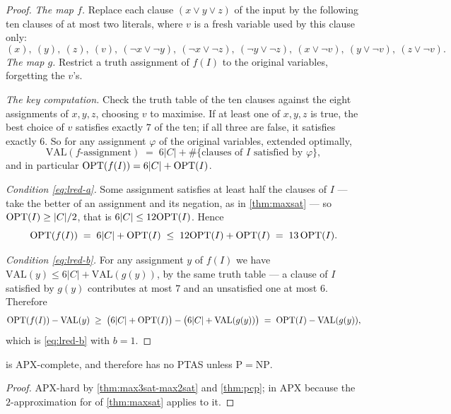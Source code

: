 \begin{proof}
\emph{The map $f$.} Replace each clause $(x \vee y \vee z)$ of the input by the
following ten clauses of at most two literals, where $v$ is a fresh variable
used by this clause only:
\[ (x),\ (y),\ (z),\ (v),\
   (\neg x \vee \neg y),\ (\neg x \vee \neg z),\ (\neg y \vee \neg z),\
   (x \vee \neg v),\ (y \vee \neg v),\ (z \vee \neg v). \]
\emph{The map $g$.} Restrict a truth assignment of $f(I)$ to the original
variables, forgetting the $v$'s.

\emph{The key computation.} Check the truth table of the ten clauses against
the eight assignments of $x,y,z$, choosing $v$ to maximise. If at least one of
$x,y,z$ is true, the best choice of $v$ satisfies exactly $7$ of the ten; if all
three are false, it satisfies exactly $6$. So for any assignment $\varphi$ of
the original variables, extended optimally,
\[ \mathrm{VAL}(f\text{-assignment}) \;=\; 6|C| + \#\{\text{clauses of } I
   \text{ satisfied by } \varphi\}, \]
and in particular $\mathrm{OPT}(f(I)) = 6|C| + \mathrm{OPT}(I)$.

\emph{Condition \eqref{eq:lred-a}.} Some assignment satisfies at least half the
clauses of $I$ --- take the better of an assignment and its negation, as in
\cref{thm:maxsat} --- so $\mathrm{OPT}(I) \ge |C|/2$, that is $6|C| \le 12\mathrm{OPT}(I)$.
Hence
\[ \mathrm{OPT}(f(I)) \;=\; 6|C| + \mathrm{OPT}(I) \;\le\; 12\mathrm{OPT}(I) + \mathrm{OPT}(I)
   \;=\; 13\,\mathrm{OPT}(I). \]

\emph{Condition \eqref{eq:lred-b}.} For any assignment $y$ of $f(I)$ we have
$\mathrm{VAL}(y) \le 6|C| + \mathrm{VAL}(g(y))$, by the same truth table --- a
clause of $I$ satisfied by $g(y)$ contributes at most $7$ and an unsatisfied one
at most $6$. Therefore
\[ \mathrm{OPT}(f(I)) - \mathrm{VAL}(y)
   \;\ge\; \bigl(6|C| + \mathrm{OPT}(I)\bigr) - \bigl(6|C| + \mathrm{VAL}(g(y))\bigr)
   \;=\; \mathrm{OPT}(I) - \mathrm{VAL}(g(y)), \]
which is \eqref{eq:lred-b} with $b = 1$.
\end{proof}

\begin{corollary}\label{cor:max2sat-apx-complete}
 is APX-complete, and therefore has no PTAS unless
$\mathrm{P} = \mathrm{NP}$.
\end{corollary}

\begin{proof}
APX-hard by \cref{thm:max3sat-max2sat} and \cref{thm:pcp}; in APX because the
$2$-approximation for  of \cref{thm:maxsat} applies to it.
\end{proof}

